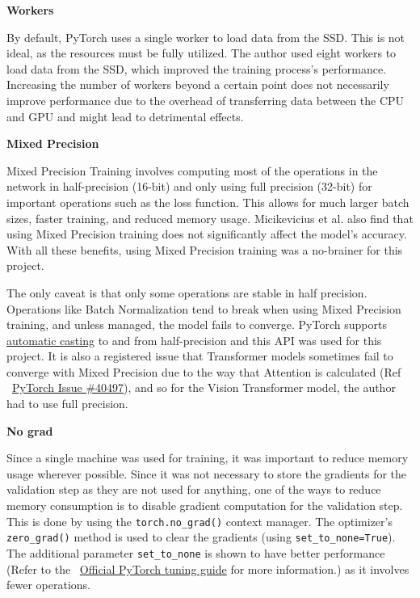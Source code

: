 \textbf{Workers}

By default, PyTorch uses a single worker to load data from the SSD. This is not ideal, as the resources must be fully utilized. The author used eight workers to load data from the SSD, which improved the training process's performance. Increasing the number of workers beyond a certain point does not necessarily improve performance due to the overhead of transferring data between the CPU and GPU and might lead to detrimental effects.

\textbf{Mixed Precision}

Mixed Precision Training \cite{micikeviciusMixedPrecisionTraining2017} involves computing most of the operations in the network in half-precision (16-bit) and only using full precision (32-bit) for important operations such as the loss function. This allows for much larger batch sizes, faster training, and reduced memory usage. Micikevicius et al. also find that using Mixed Precision training does not significantly affect the model's accuracy. With all these benefits, using Mixed Precision training was a no-brainer for this project.

The only caveat is that only some operations are stable in half precision. Operations like Batch Normalization tend to break when using Mixed Precision training, and unless managed, the model fails to converge. PyTorch supports \href{https://pytorch.org/docs/stable/notes/amp_examples.html}{automatic casting} to and from half-precision and this API was used for this project. It is also a registered issue that Transformer models sometimes fail to converge with Mixed Precision due to the way that Attention is calculated (Ref ~\href{https://github.com/pytorch/pytorch/issues/40497}{PyTorch Issue \#40497}), and so for the Vision Transformer \cite{dosovitskiyImageWorth16x162021} model, the author had to use full precision.

\textbf{No grad}

Since a single machine was used for training, it was important to reduce memory usage wherever possible. Since it was not necessary to store the gradients for the validation step as they are not used for anything, one of the ways to reduce memory consumption is to disable gradient computation for the validation step. This is done by using the \texttt{torch.no\_grad()} context manager.  The optimizer's \texttt{zero\_grad()} method is used to clear the gradients (using \texttt{set\_to\_none=True}). The additional parameter \texttt{set\_to\_none} is shown to have better performance (Refer to the ~\href{https://pytorch.org/tutorials/recipes/recipes/tuning_guide.html}{Official PyTorch tuning guide} for more information.) as it involves fewer operations.

